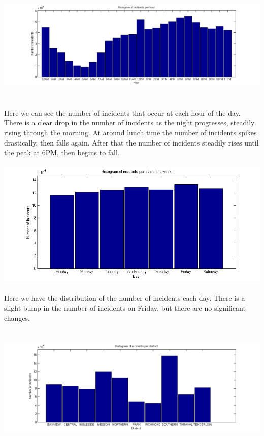 \documentclass[paper=a4, fontsize=11pt]{scrartcl} %
\numberwithin{equation}{section} %
\numberwithin{figure}{section} %
\numberwithin{table}{section} %
\begin{document}
	\hspace*{-4cm}\includegraphics[scale=0.7]{histogram_hours}
	\\\\\\
	Here we can see the number of incidents that occur at each hour of the day. There is a clear drop in the number of incidents as the night progresses, steadily rising through the morning. At around lunch time the number of incidents spikes drastically, then falls again. After that the number of incidents steadily rises until the peak at 6PM, then begins to fall.
	\\\\
	\includegraphics[scale=0.7]{histogram_days}
	\\\\
	Here we have the distribution of the number of incidents each day. There is a slight bump in the number of incidents on Friday, but there are no significant changes.
	\\\\\\
	\hspace*{-3cm}\includegraphics[scale=0.7]{histogram_district}
\end{document}
